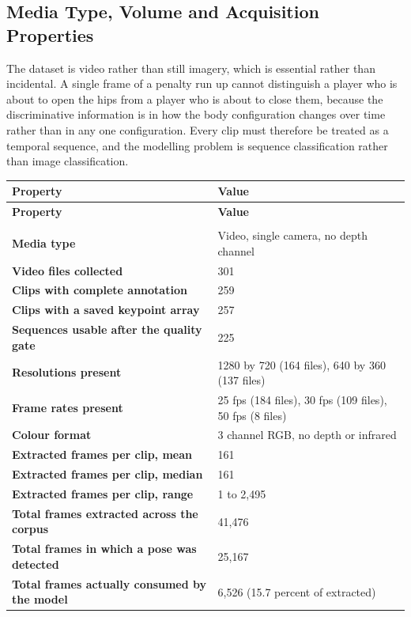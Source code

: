 \subsection{Media Type, Volume and Acquisition Properties}

The dataset is video rather than still imagery, which is essential rather than incidental. A single frame of a penalty run up cannot distinguish a player who is about to open the hips from a player who is about to close them, because the discriminative information is in how the body configuration changes over time rather than in any one configuration. Every clip must therefore be treated as a temporal sequence, and the modelling problem is sequence classification rather than image classification.

\renewcommand{\arraystretch}{1.25}
\small
\begin{longtable}{|>{\bfseries}p{6.4cm}|p{7.4cm}|}
\hline
\textbf{Property} & \textbf{Value} \\ \hline
\endfirsthead
\hline
\textbf{Property} & \textbf{Value} \\ \hline
\endhead
\hline
\multicolumn{2}{r}{\textit{Continued on next page}} \\
\hline
\endfoot
\hline
\endlastfoot
Media type & Video, single camera, no depth channel \\ \hline
Video files collected & 301 \\ \hline
Clips with complete annotation & 259 \\ \hline
Clips with a saved keypoint array & 257 \\ \hline
Sequences usable after the quality gate & 225 \\ \hline
Resolutions present & 1280 by 720 (164 files), 640 by 360 (137 files) \\ \hline
Frame rates present & 25 fps (184 files), 30 fps (109 files), 50 fps (8 files) \\ \hline
Colour format & 3 channel RGB, no depth or infrared \\ \hline
Extracted frames per clip, mean & 161 \\ \hline
Extracted frames per clip, median & 161 \\ \hline
Extracted frames per clip, range & 1 to 2,495 \\ \hline
Total frames extracted across the corpus & 41,476 \\ \hline
Total frames in which a pose was detected & 25,167 \\ \hline
Total frames actually consumed by the model & 6,526 (15.7 percent of extracted) \\ \hline

\end{longtable}
